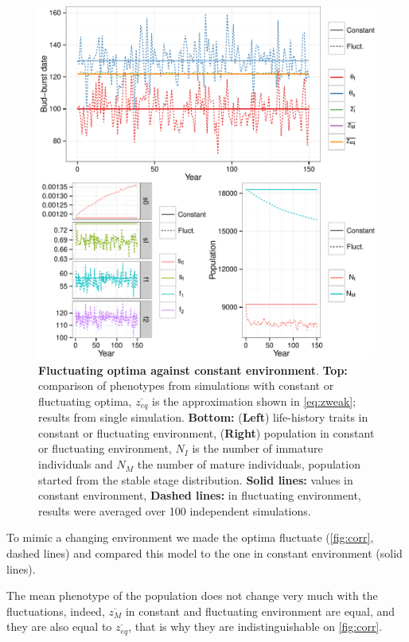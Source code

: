 \begin{figure}[ht!]
	\centering
	\includegraphics[scale=1]{Figures/PhenoLHTwithCorr.pdf}
	\caption{\textbf{Fluctuating optima against constant environment}. \textbf{Top:} comparison of phenotypes from simulations with constant or fluctuating optima, $\overline{z_{eq}}$ is the approximation shown in \autoref{eq:zweak}; results from single simulation. \textbf{Bottom:} (\textbf{Left}) life-history traits in constant or fluctuating environment, (\textbf{Right}) population in constant or fluctuating environment, $N_I$ is the number of immature individuals and $N_M$ the number of mature individuals, population started from the stable stage distribution. \textbf{Solid lines:} values in constant environment, \textbf{Dashed lines:} in fluctuating environment, results were averaged over 100 independent simulations.}
	\label{fig:corr}
\end{figure}

To mimic a changing environment we made the optima fluctuate (\autoref{fig:corr}, dashed lines) and compared this model to the one in constant environment (solid lines).

The mean phenotype of the population does not change very much with the fluctuations, indeed, $\overline{z_M}$ in constant and fluctuating environment are equal, and they are also equal to $\overline{z_{eq}}$, that is why they are indistinguishable on \autoref{fig:corr}.

